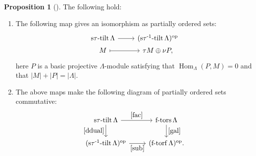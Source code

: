 \documentclass[pdftex,a4paper]{article}
\numberwithin{equation}{subsection}
\theoremstyle{definition}
\newtheorem{proposition}[theorem]{Proposition}
\newcommand{\opo}{\operatorname{\mathrm{op}}}
\newcommand{\Hom}{\operatorname{Hom}\nolimits}
\newcommand{\stautilt}{\operatorname{\mathrm{s\tau-tilt}}}
\newcommand{\stauitilt}{\operatorname{\mathrm{s\tau^{-1}-tilt}}}
\newcommand{\ftors}{\operatorname{\mathrm{f-tors}}}
\newcommand{\ftorf}{\operatorname{\mathrm{f-torf}}}
\begin{document}
\begin{proposition}[{\cite[below Theorem 2.15 and Proposition 2.27]{MR3187626}}]\label{dugger 2021-09-06 13:33:14}
	The following hold:
	\begin{enumerate}
		\item The following map gives an isomorphism as partially ordered sets:
		      \begin{equation}\label{ddual}
			      \begin{tikzcd}[row sep=1pt]
				      \stautilt \Lambda \ar[r] &(\stauitilt \Lambda)^{\opo}\\
				      M \ar[r,mapsto]& \tau M\oplus \nu P,
			      \end{tikzcd}
		      \end{equation}
		      here \(P\) is a basic projective \(\Lambda\)-module satisfying that \(\Hom_\Lambda(P,M)=0\) and that \(|M|+|P|=|\Lambda|\).
		\item The above maps make the following diagram of partially ordered sets commutative:
		      \begin{equation}
			      \begin{tikzcd}
				      \stautilt \Lambda \ar[r,"\eqref{fac}"] \ar[d,"\eqref{ddual}"']&\ftors \Lambda\ar[d,"\eqref{gal}"]\\
				      (\stauitilt \Lambda)^{\opo} \ar[r,"\eqref{sub}"']&(\ftorf \Lambda)^{\opo}.
			      \end{tikzcd}
		      \end{equation}
	\end{enumerate}
\end{proposition}
\end{document}
